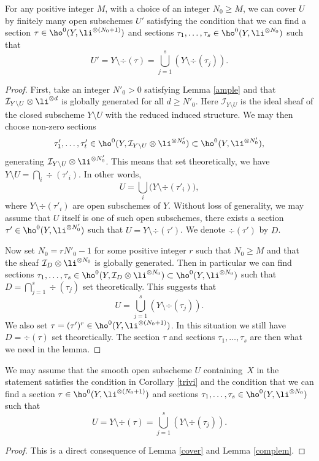 \begin{lem}\label{complem}
For any positive integer $M$, with a choice of an integer $N_0\geq M$, we can cover $U$ by finitely many open subschemes $U'$ satisfying the condition that we can find a section $\tau\in \ho^0(Y, \li^{\otimes (N_0+1)})$ and sections $\tau_1,\dots, \tau_s\in \ho^0(Y, \li^{\otimes N_0})$ such that\vspace*{-3pt}
\[
U'=Y\setminus\div (\tau)=\bigcup_{j=1}^s\left(Y\setminus\div (\tau_j)\right).
\]
\end{lem}
\begin{proof}[Proof]
First, take an integer $N'_0>0$ satisfying Lemma \ref{ample} and that $\mathcal{I}_{Y\setminus U}\otimes \li^{\otimes d}$ is globally generated for all $d\geq N'_0$. Here $\mathcal{I}_{Y\setminus U}$ is the ideal sheaf of the closed subscheme $Y\setminus U$ with the reduced induced structure. We may then choose non-zero sections\vspace*{-3pt}
\[
\tau'_1,\dots, \tau'_t\in \ho^0(Y, \mathcal{I}_{Y\setminus U}\otimes \li^{\otimes N'_0})\subset \ho^0(Y, \li^{\otimes N'_0}),
\]
generating $\mathcal{I}_{Y\setminus U}\otimes \li^{\otimes N'_0}$. This means that set theoretically, we have $Y\setminus U=\bigcap_{i}\div (\tau'_i)$. In other words,\vspace*{-3pt}
\[
U=\bigcup_{i}\big(Y\setminus\div (\tau'_i) \big),
\]
where $Y\setminus\div (\tau'_i)$ are open subschemes of $Y$. Without loss of generality, we may assume that $U$ itself is one of such open subschemes, \ie there exists a section $\tau'\in \ho^0(Y, \li^{\otimes N'_0})$ such that $U=Y\setminus\div (\tau')$. We denote $\div (\tau')$ by $D$.

Now set $N_0=r N'_0-1$ for some positive integer $r$ such that $N_0\geq M$ and that the sheaf $\mathcal{I}_D\otimes \li^{\otimes N_0}$ is globally generated. Then in particular we can find sections $\tau_1,\dots, \tau_s\in \ho^0(Y, \mathcal{I}_D\otimes \li^{\otimes N_0})\subset \ho^0(Y, \li^{\otimes N_0})$ such that $D=\bigcap_{j=1}^s\div (\tau_j)$ set theoretically. This suggests that\vspace*{-3pt}
\[
U=\bigcup_{j=1}^s\left(Y\setminus\div (\tau_j)\right).
\]
We also set $\tau=(\tau')^r\in \ho^0(Y, \li^{\otimes (N_0+1)})$. In this situation we still have $D=\div (\tau)$ set theoretically. The section $\tau$ and sections $\tau_1,\dots, \tau_s$ are then what we need in the lemma.
\end{proof}

\begin{cor}
We may assume that the smooth open subscheme $U$ containing~$X$ in the statement satisfies the condition in Corollary \ref{trivi} and the condition that we can find a section $\tau\in \ho^0(Y, \li^{\otimes (N_0+1)})$ and sections $\tau_1,\dots, \tau_s\in \ho^0(Y, \li^{\otimes N_0})$ such that\vspace*{-3pt}
\[
U=Y\setminus\div (\tau)=\bigcup_{j=1}^s\left(Y\setminus\div (\tau_j)\right).
\]
\end{cor}
\begin{proof}[Proof]
This is a direct consequence of Lemma \ref{cover} and Lemma \ref{complem}.
\end{proof}

